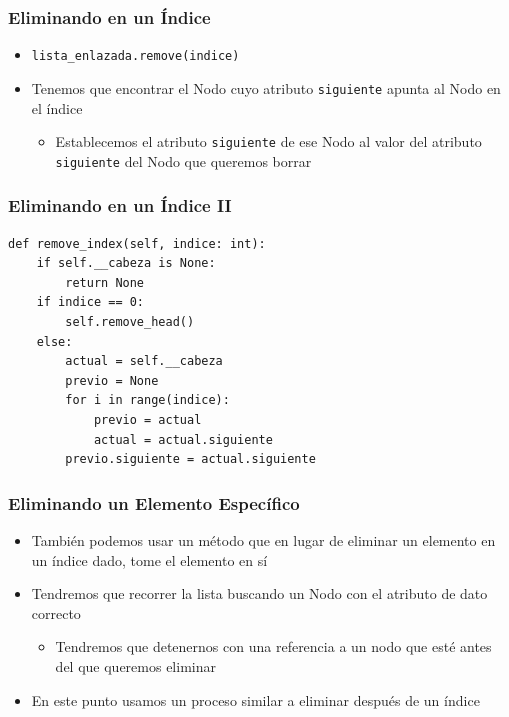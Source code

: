 \documentclass[11pt]{beamer}
\begin{document}
	\begin{frame}
		\frametitle{Eliminando en un Índice}
		\begin{itemize}
			\item \lstinline|lista_enlazada.remove(indice)|
			\item Tenemos que encontrar el Nodo cuyo atributo \texttt{siguiente} apunta al Nodo en el índice
			\begin{itemize}
				\item Establecemos el atributo \texttt{siguiente} de ese Nodo al valor del atributo \texttt{siguiente} del Nodo que queremos borrar
			\end{itemize}
		\end{itemize}
		\vspace{0.7cm}
		\begin{center}
		\end{center}
	\end{frame}

	\begin{frame}[fragile]
		\frametitle{Eliminando en un Índice II}
\begin{lstlisting}
def remove_index(self, indice: int):
	if self.__cabeza is None:
		return None
	if indice == 0:
		self.remove_head()
	else:
		actual = self.__cabeza
		previo = None
		for i in range(indice):
			previo = actual
			actual = actual.siguiente
		previo.siguiente = actual.siguiente
\end{lstlisting}
	\end{frame}

	\begin{frame}
	\frametitle{Eliminando un Elemento Específico}
		\begin{itemize}
            \item También podemos usar un método que en lugar de eliminar un elemento en un índice dado, tome el elemento en sí
            \item Tendremos que recorrer la lista buscando un Nodo con el atributo de dato correcto
            \begin{itemize}
                \item Tendremos que detenernos con una referencia a un nodo que esté antes del que queremos eliminar
            \end{itemize}
            \item En este punto usamos un proceso similar a eliminar después de un índice
        \end{itemize}
     \end{frame}
                
\end{document}
